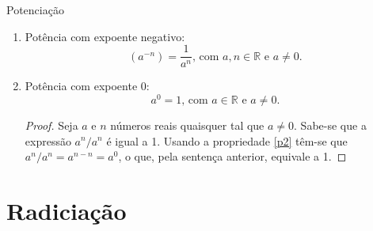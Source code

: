 \documentclass[14pt, aspectratio=169]{beamer}
\newcommand{\R}{\mathbb{R}}
\newcommand{\skipframe}{\vspace{10.0cm}}
\begin{document}
\begin{frame}[allowframebreaks]{Potenciação}
\begin{itemize}
\begin{enumerate}[a]
        \item Potência com expoente negativo:
        \begin{equation*}
            \left( a^{-n} \right) = \dfrac{1}{a^n} \text{, com } a,n \in \R \text{ e } a \neq 0.
        \end{equation*}

        \skipframe

        \item Potência com expoente 0:
        \begin{equation*}
            a^0 = 1 \text{, com } a \in \R \text{ e } a \neq 0.
        \end{equation*}

        \begin{proof}
            Seja $a$ e $n$ números reais quaisquer tal que $a \neq 0$. Sabe-se que a expressão $a^n / a^n$ é igual a 1. Usando a propriedade \ref{p2} têm-se que $a^n / a^n = a^{n-n} = a^0$, o que, pela sentença anterior, equivale a 1.
        \end{proof}
        
    \end{enumerate}
\end{itemize}
    
\end{frame}

\section{Radiciação}
\end{document}
